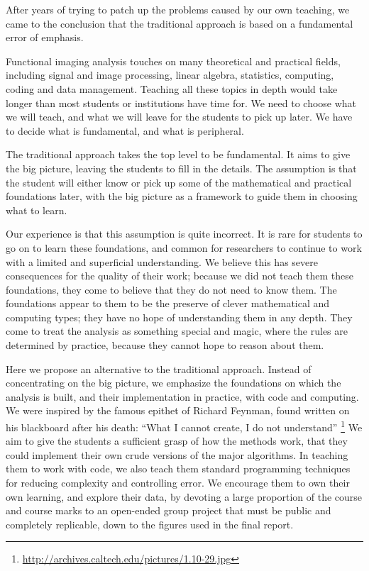 After years of trying to patch up the problems caused by our own teaching, we
came to the conclusion that the traditional approach is based on a fundamental
error of emphasis.

Functional imaging analysis touches on many theoretical and practical fields,
including signal and image processing, linear algebra, statistics, computing,
coding and data management.  Teaching all these topics in depth would take
longer than most students or institutions have time for.  We need to choose
what we will teach, and what we will leave for the students to pick up later.
We have to decide what is fundamental, and what is peripheral.

The traditional approach takes the top level to be fundamental.  It aims to
give the big picture, leaving the students to fill in the details. The
assumption is that the student will either know or pick up some of the
mathematical and practical foundations later, with the big picture as a
framework to guide them in choosing what to learn.

Our experience is that this assumption is quite incorrect.  It is rare for
students to go on to learn these foundations, and common for researchers to
continue to work with a limited and superficial understanding.  We believe
this has severe consequences for the quality of their work; because we did not
teach them these foundations, they come to believe that they do not need to
know them.  The foundations appear to them to be the preserve of clever
mathematical and computing types; they have no hope of understanding them in
any depth.  They come to treat the analysis as something special and magic,
where the rules are determined by practice, because they cannot hope to reason
about them.

Here we propose an alternative to the traditional approach.  Instead of
concentrating on the big picture, we emphasize the foundations on which the
analysis is built, and their implementation in practice, with code and
computing.  We were inspired by the famous epithet of Richard Feynman, found
written on his blackboard after his death: ``What I cannot create, I do not
understand''
\footnote{\url{http://archives.caltech.edu/pictures/1.10-29.jpg}}
We aim to give the students a sufficient grasp of how the methods work, that
they could implement their own crude versions of the major algorithms.  In
teaching them to work with code, we also teach them standard programming
techniques for reducing complexity and controlling error.  We encourage them
to own their own learning, and explore their data, by devoting a large
proportion of the course and course marks to an open-ended group project that
must be public and completely replicable, down to the figures used in the
final report.

